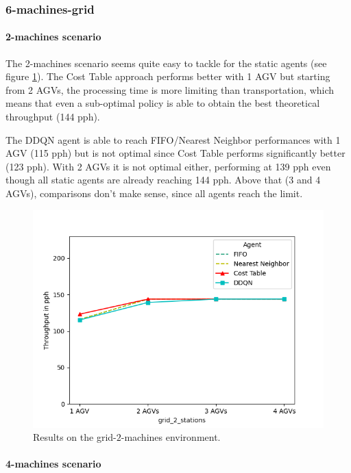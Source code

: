 \documentclass[sn-mathphys]{sn-jnl}
\begin{document}
\subsubsection{6-machines-grid}

\paragraph{2-machines scenario}

The 2-machines scenario seems quite easy to tackle for the static agents (see figure \ref{fig:grid_2_machines_results}). The Cost Table approach performs better with 1 AGV but starting from 2 AGVs, the processing time is more limiting than transportation, which means that even a sub-optimal policy is able to obtain the best theoretical throughput (144 pph). 

The DDQN agent is able to reach FIFO/Nearest Neighbor performances with 1 AGV (115 pph) but is not optimal since Cost Table performs significantly better (123 pph). With 2 AGVs it is not optimal either, performing at 139 pph even though all static agents are already reaching 144 pph. Above that (3 and 4 AGVs), comparisons don't make sense, since all agents reach the limit.

\begin{figure}[ht]
  \includegraphics[width=1.0\textwidth]{results_grid_2_machines.png}
  \caption{Results on the grid-$2$-machines environment.}
  \label{fig:grid_2_machines_results}
\end{figure}

\paragraph{4-machines scenario}
\end{document}
